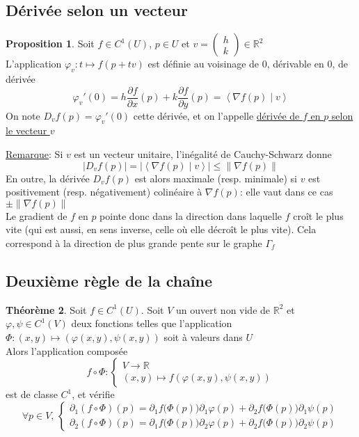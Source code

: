 \documentclass[10pt,a4paper]{article}
\theoremstyle{definition}
\newtheorem{proposition}{Proposition}[section]
\newtheorem{theorem}[proposition]{Théorème}
\begin{document}
\subsection{Dérivée selon un vecteur}
\begin{proposition}
Soit $f \in C^1(U)$, $p \in U$ et $v = \begin{pmatrix}
h \\
k
\end{pmatrix} \in \mathbb{R}^2$ \\
L'application $\varphi_v: t \mapsto f(p + tv)$ est définie au voisinage de $0$, dérivable en $0$, de dérivée
\[ \varphi_v'(0) = h \frac{\partial f}{\partial x}(p) + k \frac{\partial f}{\partial y}(p) = \left< \nabla f(p) \mid v \right> \]
On note $D_vf(p) = \varphi_v'(0)$ cette dérivée, et on l'appelle \uline{dérivée de $f$ en $p$ selon le vecteur $v$}
\end{proposition}

\noindent \uline{Remarque}: Si $v$ est un vecteur unitaire, l'inégalité de Cauchy-Schwarz donne
\[ |D_vf(p)| = |\left< \nabla f(p) \mid v \right>| \leq \| \nabla f(p) \| \]
En outre, la dérivée $D_vf(p)$ est alors maximale (resp. minimale) si $v$ est positivement (resp. négativement) colinéaire à $\nabla f(p)$: elle vaut dans ce cas $\pm \| \nabla f(p) \|$ \\
Le gradient de $f$ en $p$ pointe donc dans la direction dans laquelle $f$ croît le plus vite (qui est aussi, en sens inverse, celle où elle décroît le plus vite). Cela correspond à la direction de plus grande pente sur le graphe $\Gamma_f$

\subsection{Deuxième règle de la chaîne}
\begin{theorem}
Soit $f \in C^1(U)$. Soit $V$ un ouvert non vide de $\mathbb{R}^2$ et $\varphi, \psi \in C^1(V)$ deux fonctions telles que l'application $\Phi: (x, y) \mapsto \left(\varphi(x, y), \psi(x, y)\right)$ soit à valeurs dans $U$ \\
Alors l'application composée
\[ f \circ \Phi: \begin{cases}
V \to \mathbb{R} \\
(x, y) \mapsto f\left(\varphi(x, y), \psi(x, y)\right)
\end{cases} \]
est de classe $C^1$, et vérifie
\[ \forall p \in V,\, \begin{cases}
\partial_1(f \circ \Phi)(p) = \partial_1f\big(\Phi(p)\big) \partial_1 \varphi(p) + \partial_2 f\big(\Phi(p)\big) \partial_1 \psi(p) \\
\partial_2(f \circ \Phi)(p) = \partial_1f\big(\Phi(p)\big) \partial_2 \varphi(p) + \partial_2 f\big(\Phi(p)\big) \partial_2 \psi(p)
\end{cases} \]
\end{theorem}
\end{document}
